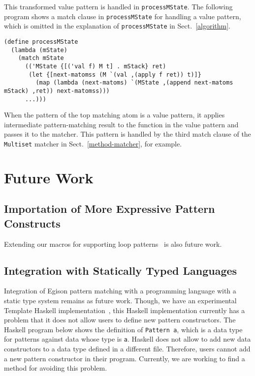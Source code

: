 \documentclass[acmlarge]{acmart}
\begin{document}
This transformed value pattern is handled in \texttt{processMState}.
The following program shows a match clause in \texttt{processMState} for handling a value pattern, which is omitted in the explanation of \texttt{processMState} in Sect.~\ref{algorithm}.

\begin{lstlisting}[language=egison]
(define processMState
  (lambda (mState)
    (match mState
      (('MState {[('val f) M t] . mStack} ret)
       (let {[next-matomss (M `(val ,(apply f ret)) t)]}
         (map (lambda (next-matoms) `(MState ,(append next-matoms mStack) ,ret)) next-matomss)))
      ...)))
\end{lstlisting}

\noindent
When the pattern of the top matching atom is a value pattern, it applies intermediate pattern-matching result to the function in the value pattern and passes it to the matcher.
This pattern is handled by the third match clause of the \texttt{Multiset} matcher in Sect.~\ref{method-matcher}, for example.

\section{Future Work}\label{future}

%
%
%
%
%

\subsection{Importation of More Expressive Pattern Constructs}

Extending our macros for supporting loop patterns~\cite{egi2018loop} is also future work.

\subsection{Integration with Statically Typed Languages}

Integration of Egison pattern matching with a programming language with a static type system remains as future work.
Though, we have an experimental Template Haskell implementation~\cite{egisonHaskell}, this Haskell implementation currently has a problem that it does not allow users to define new pattern constructors.
The Haskell program below shows the definition of \texttt{Pattern a}, which is a data type for patterns against data whose type is \texttt{a}.
Haskell does not allow to add new data constructors to a data type defined in a different file.
Therefore, users cannot add a new pattern constructor in their program.
Currently, we are working to find a method for avoiding this problem.
\end{document}

